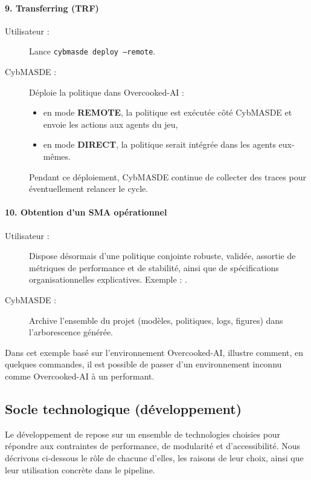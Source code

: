 \paragraph{9. Transferring (TRF)}
\begin{description}
  \item[Utilisateur :] Lance \texttt{cybmasde deploy --remote}.
  \item[CybMASDE :] Déploie la politique dans Overcooked-AI :
    \begin{itemize}
      \item en mode \textbf{REMOTE}, la politique est exécutée côté CybMASDE et envoie les actions aux agents du jeu,
      \item en mode \textbf{DIRECT}, la politique serait intégrée dans les agents eux-mêmes.
    \end{itemize}
    Pendant ce déploiement, CybMASDE continue de collecter des traces pour éventuellement relancer le cycle.
\end{description}

\paragraph{10. Obtention d’un SMA opérationnel}
\begin{description}
  \item[Utilisateur :] Dispose désormais d’une politique conjointe robuste, validée, assortie de métriques de performance et de stabilité, ainsi que de spécifications organisationnelles explicatives.
    Exemple : .
  \item[CybMASDE :] Archive l’ensemble du projet (modèles, politiques, logs, figures) dans l’arborescence générée.
\end{description}

\medskip
Dans cet exemple basé sur l'environnement Overcooked-AI,  illustre comment, en quelques commandes, il est possible de passer d’un environnement inconnu comme Overcooked-AI à un  performant.


\subsection{Socle technologique (développement)}

Le développement de  repose sur un ensemble de technologies choisies pour répondre aux contraintes de performance, de modularité et d’accessibilité.
Nous décrivons ci-dessous le rôle de chacune d’elles, les raisons de leur choix, ainsi que leur utilisation concrète dans le pipeline.

